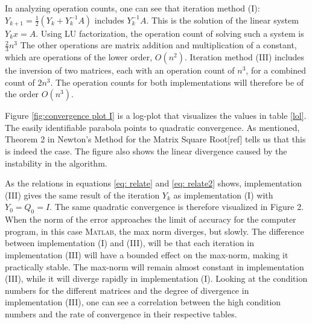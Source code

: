 In analyzing operation counts, one can see that iteration method (I): $Y_{k+1}=\frac{1}{2}(Y_{k}+Y_{k}^{-1}A)$ includes $Y_{k}^{-1}A$. This is the solution of the linear system $Y_{k}x=A$. Using LU factorization, the operation count of solving such a system is $\frac{2}{3}n^{3}$ The other operations are matrix addition and multiplication of a constant, which are operations of the lower order, $O(n^{2})$. Iteration method (III) includes the inversion of two matrices, each with an operation count of $n^{3}$, for a combined count of $2n^{3}$. The operation counts for both implementations will therefore be of the order $O(n^3)$.

Figure \ref{fig:convergence plot I} is a log-plot that visualizes the values in table \ref{lol}. The easily identifiable parabola points to quadratic convergence. As mentioned, Theorem 2 in Newton's Method for the Matrix Square Root[ref] tells us that this is indeed the case. The figure also shows the linear divergence caused by the instability in the algorithm. 

As the relations in equations \ref{eq: relate} and \ref{eq: relate2}  shows, implementation (III) gives the same result of the iteration  $Y_k$ as implementation (I) with $Y_{0}=Q_{0}=I$. The same quadratic convergence is therefore visualized in Figure 2. When the norm of the error approaches the limit of accuracy for the computer program, in this case \textsc{Matlab}, the max norm diverges, but slowly. The difference between implementation (I) and (III), will be that each iteration in implementation (III) will have a bounded effect on the max-norm, making it practically stable. The max-norm will remain almost constant in implementation (III), while it will diverge rapidly in implementation (I). Looking at the condition numbers for the different matrices and the degree of divergence in implementation (III), one can see a correlation between the high condition numbers and the rate of convergence in their respective tables.




